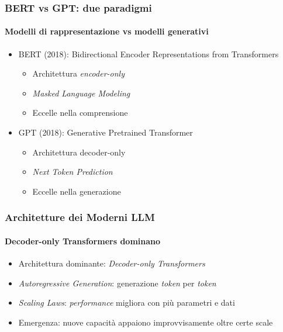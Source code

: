 \begin{frame}[t,fragile] \frametitle{BERT vs GPT: due paradigmi}
\framesubtitle{Modelli di rappresentazione vs modelli generativi}
    {\small
    \begin{minipage}[t]{\textwidth}
        \begin{itemize}[leftmargin=10pt,align=right]
            \item[\alert{\faArrowCircleRight}] \alert{BERT (2018):} \alert{B}idirectional \alert{E}ncoder \alert{R}epresentations from \alert{T}ransformers
            \begin{itemize}[leftmargin=10pt,align=right]
                \item[\alert{\faArrowCircleRight}] Architettura \textit{encoder-only}
                \item[\alert{\faArrowCircleRight}] \textit{Masked Language Modeling}
                \item[\alert{\faArrowCircleRight}] Eccelle nella \alert{comprensione}
        \end{itemize}
        \item[\alert{\faArrowCircleRight}] \alert{GPT (2018):} Generative Pretrained Transformer
            \begin{itemize}[leftmargin=10pt,align=right]
                \item[\alert{\faArrowCircleRight}] Architettura decoder-only
                \item[\alert{\faArrowCircleRight}] \textit{Next Token Prediction}
                \item[\alert{\faArrowCircleRight}] Eccelle nella \alert{generazione}
            \end{itemize}
        \end{itemize}
    \end{minipage}
    }
\end{frame}
%
\begin{frame}[t,fragile] \frametitle{Architetture dei Moderni LLM}
\framesubtitle{Decoder-only Transformers dominano}
    {\small
        \begin{minipage}[t]{\textwidth}
            \begin{itemize}[leftmargin=10pt,align=right]
                \item[\alert{\faArrowCircleRight}] \alert{Architettura dominante:} \textit{Decoder-only Transformers}
                \item[\alert{\faArrowCircleRight}] \alert{\textit{Autoregressive Generation}:} generazione \textit{token} per \textit{token}
                \item[\alert{\faArrowCircleRight}] \alert{\textit{Scaling Laws}:} \textit{performance} migliora con più parametri e dati
                \item[\alert{\faArrowCircleRight}] \alert{Emergenza:} nuove capacità appaiono improvvisamente oltre certe scale
            \end{itemize}
        \end{minipage}
    }
\end{frame}
